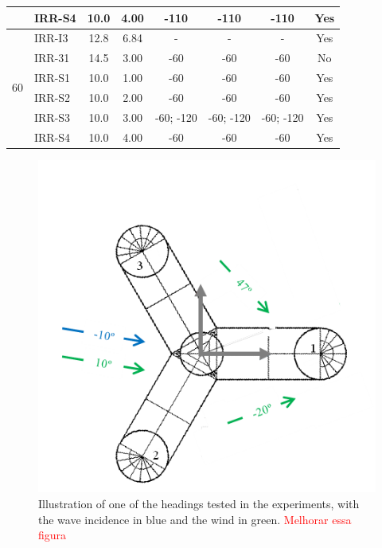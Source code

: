 \begin{table}[htbp]
\begin{tabular}{clcccccc}
		& IRR-S4 & 10.0  & 4.00  & -110  & -110  & -110 & Yes\\
		\midrule
		\multirow{6}[2]{*}{60\textdegree{}} & IRR-I3 & 12.8  & 6.84 & -     & -     & - & Yes\\
		& IRR-31 & 14.5  & 3.00  & -60\textdegree{}   & -60\textdegree{}   & -60\textdegree{} & No\\
		& IRR-S1 & 10.0  & 1.00  & -60\textdegree{}   & -60\textdegree{}   & -60\textdegree{} & Yes\\
		& IRR-S2 & 10.0  & 2.00  & -60\textdegree{}   & -60\textdegree{}   & -60\textdegree{} & Yes\\
		& IRR-S3 & 10.0  & 3.00  & -60\textdegree{}; -120\textdegree{} & -60\textdegree{}; -120\textdegree{} & -60\textdegree{}; -120\textdegree{} & Yes\\
		& IRR-S4 & 10.0  & 4.00  & -60\textdegree{}   & -60\textdegree{}   & -60\textdegree{} & Yes\\
		\bottomrule
	\end{tabular}%
	\label{tab:addlabel}%
\end{table}%



\begin{figure}[!hbtp]
	\centering
	\includegraphics[trim={0 0 0 1.5cm},clip, width=0.4\columnwidth]{./figures/APR01.png}
	\caption{Illustration of one of the headings tested in the experiments, with the wave incidence in blue and the wind in green. \textcolor{red}{Melhorar essa figura}} \label{fig:description_experiment:APR01}%
\end{figure}%




